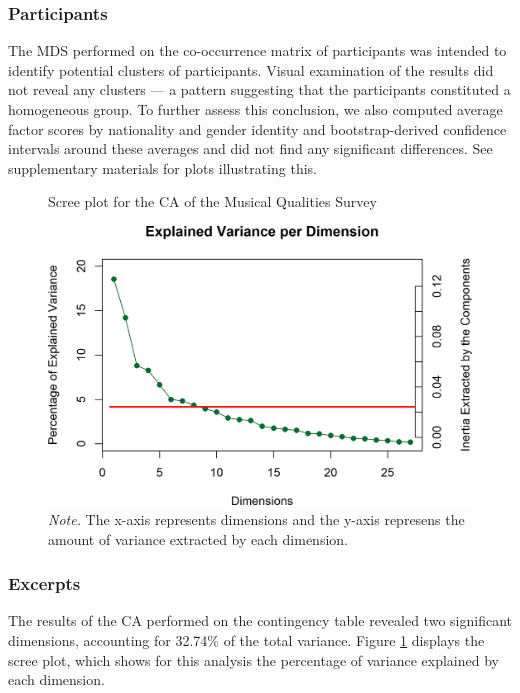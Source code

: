 \documentclass[
  english,
  man,floatsintext]{apa6}
\begin{document}
\hypertarget{participants-1}{%
\subsubsection{Participants}\label{participants-1}}

The MDS performed on the co-occurrence matrix of participants was intended to identify potential clusters of participants. Visual examination of the results did not reveal any clusters --- a pattern suggesting that the participants constituted a homogeneous group. To further assess this conclusion, we also computed average factor scores by nationality and gender identity and bootstrap-derived confidence intervals around these averages and did not find any significant differences. See supplementary materials for plots illustrating this.

\begin{figure}  
  \begin{center}
  \caption{Scree plot for the CA of the Musical Qualities Survey}
    \includegraphics{./Music-Descriptor-Space_files/figure-latex/scree4excerptsq-1.png}
  \caption*{\footnotesize \textit{Note.} The x-axis represents dimensions and the y-axis represens the amount of variance extracted by each dimension. }\label{fig:scree4excerptsq}  
 \end{center}
\end{figure}

\hypertarget{excerpts}{%
\subsubsection{Excerpts}\label{excerpts}}

The results of the CA performed on the contingency table revealed two significant dimensions, accounting for 32.74\% of the total variance. Figure \ref{fig:scree4excerptsq} displays the scree plot, which shows for this analysis the percentage of variance explained by each dimension.
\end{document}
